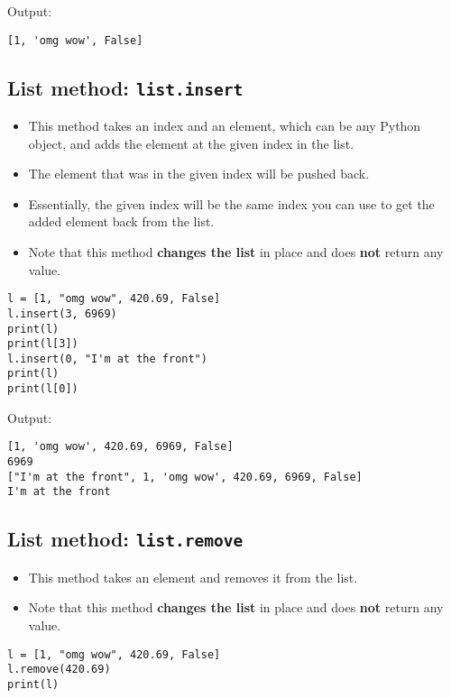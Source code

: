 \documentclass[11pt]{article}
\begin{document}
 \noindent Output:

\label{orgb851485}
\begin{verbatim}
[1, 'omg wow', False]
\end{verbatim}
\subsection{List method: \texttt{list.insert}}
\label{sec:orga9a8f95}
\begin{itemize}
\item This method takes an index and an element, which can be any Python object, and adds the element at the given index in the list.
\item The element that was in the given index will be pushed back.
\item Essentially, the given index will be the same index you can use to get the added element back from the list.
\item Note that this method \textbf{changes the list} in place and does \textbf{not} return any value.
\end{itemize}

\begin{verbatim}
l = [1, "omg wow", 420.69, False]
l.insert(3, 6969)
print(l)
print(l[3])
l.insert(0, "I'm at the front")
print(l)
print(l[0])
\end{verbatim}

 \noindent Output:

\label{org3f7bc1f}
\begin{verbatim}
[1, 'omg wow', 420.69, 6969, False]
6969
["I'm at the front", 1, 'omg wow', 420.69, 6969, False]
I'm at the front
\end{verbatim}
\subsection{List method: \texttt{list.remove}}
\label{sec:orgb4c2857}
\begin{itemize}
\item This method takes an element and removes it from the list.
\item Note that this method \textbf{changes the list} in place and does \textbf{not} return any value.
\end{itemize}

\begin{verbatim}
l = [1, "omg wow", 420.69, False]
l.remove(420.69)
print(l)
\end{verbatim}
\end{document}
